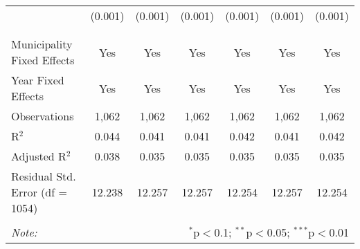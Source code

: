 \begin{table}[!htbp]
\begin{tabular}{@{\extracolsep{5pt}}lcccccc}
  & (0.001) & (0.001) & (0.001) & (0.001) & (0.001) & (0.001) \\ 
  & & & & & & \\ 
\hline \\[-1.8ex] 
Municipality Fixed Effects & Yes & Yes & Yes & Yes & Yes & Yes \\ 
Year Fixed Effects & Yes & Yes & Yes & Yes & Yes & Yes \\ 
Observations & 1,062 & 1,062 & 1,062 & 1,062 & 1,062 & 1,062 \\ 
R$^{2}$ & 0.044 & 0.041 & 0.041 & 0.042 & 0.041 & 0.042 \\ 
Adjusted R$^{2}$ & 0.038 & 0.035 & 0.035 & 0.035 & 0.035 & 0.035 \\ 
Residual Std. Error (df = 1054) & 12.238 & 12.257 & 12.257 & 12.254 & 12.257 & 12.254 \\ 
\hline 
\hline \\[-1.8ex] 
\textit{Note:}  & \multicolumn{6}{r}{$^{*}$p$<$0.1; $^{**}$p$<$0.05; $^{***}$p$<$0.01} \\ 
\end{tabular} 
\end{table} 
